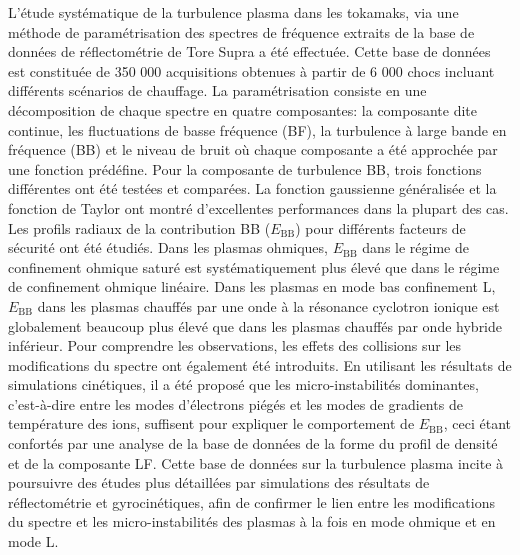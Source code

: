 L'\'{e}tude syst\'{e}matique de la turbulence plasma dans les tokamaks, via une m\'{e}thode de param\'{e}trisation des spectres de fr\'{e}quence extraits de la base de donn\'{e}es de r\'{e}flectom\'{e}trie de Tore Supra a \'{e}t\'{e} effectu\'{e}e. Cette base de donn\'{e}es est constitu\'{e}e de 350 000 acquisitions obtenues \`{a} partir de 6 000 chocs incluant diff\'{e}rents sc\'{e}narios de chauffage. La param\'{e}trisation consiste en une d\'{e}composition de chaque spectre en quatre composantes: la composante dite continue, les fluctuations de basse fr\'{e}quence (BF), la turbulence \`{a} large bande en fr\'{e}quence (BB) et le niveau de bruit o\`{u} chaque composante a \'{e}t\'{e} approch\'{e}e par une fonction pr\'{e}d\'{e}fine. Pour la composante de turbulence BB, trois fonctions diff\'{e}rentes ont \'{e}t\'{e} test\'{e}es et compar\'{e}es. La fonction gaussienne g\'{e}n\'{e}ralis\'{e}e et la fonction de Taylor ont montr\'{e} d'excellentes performances dans la plupart des cas. Les profils radiaux de la contribution BB ($E_\mathrm{BB}$) pour diff\'{e}rents facteurs de s\'{e}curit\'{e} ont \'{e}t\'{e} \'{e}tudi\'{e}s. Dans les plasmas ohmiques, $E_\mathrm{BB}$ dans le r\'{e}gime de confinement ohmique satur\'{e} est syst\'{e}matiquement plus \'{e}lev\'{e} que dans le r\'{e}gime de confinement ohmique lin\'{e}aire. Dans les plasmas en mode bas confinement L, $E_\mathrm{BB}$ dans les plasmas chauff\'{e}s par une onde  \`{a} la r\'{e}sonance cyclotron ionique est globalement beaucoup plus \'{e}lev\'{e} que dans les plasmas chauff\'{e}s par onde hybride inf\'{e}rieur. Pour comprendre les observations, les effets des collisions sur les modifications du spectre ont \'{e}galement \'{e}t\'{e} introduits. En utilisant les r\'{e}sultats de simulations cin\'{e}tiques, il a \'{e}t\'{e} propos\'{e} que les micro-instabilit\'{e}s dominantes, c'est-\`{a}-dire entre les modes d'\'{e}lectrons pi\'{e}g\'{e}s et les modes de gradients de temp\'{e}rature des ions, suffisent pour expliquer le comportement de $E_\mathrm{BB}$, ceci \'{e}tant confort\'{e}s par une analyse de la base de donn\'{e}es de la forme du profil de densit\'{e} et de la composante LF. Cette base de donn\'{e}es sur la turbulence plasma incite \`{a} poursuivre des \'{e}tudes plus d\'{e}taill\'{e}es par simulations des r\'{e}sultats de r\'{e}flectom\'{e}trie et gyrocin\'{e}tiques, afin de confirmer le lien entre les modifications du spectre et les micro-instabilit\'{e}s des plasmas \`{a} la fois en mode ohmique et en mode L.


\thispagestyle{empty}